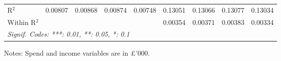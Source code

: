 \begin{table}[htbp]
\begin{threeparttable}[b]
\begin{tabular}{lcccccccc}
         R$^2$                    & 0.00807         & 0.00868         & 0.00874         & 0.00748         & 0.13051         & 0.13066         & 0.13077         & 0.13034\\  
         Within R$^2$             &                 &                 &                 &                 & 0.00354         & 0.00371         & 0.00383         & 0.00334\\  
         \midrule \midrule
         \multicolumn{9}{l}{\emph{Signif. Codes: ***: 0.01, **: 0.05, *: 0.1}}\\
      \end{tabular}
      
      \begin{tablenotes}\footnotesize
         \item Notes: Spend and income variables are in \pounds'000.
      \end{tablenotes}
   \end{threeparttable}
\end{table}


